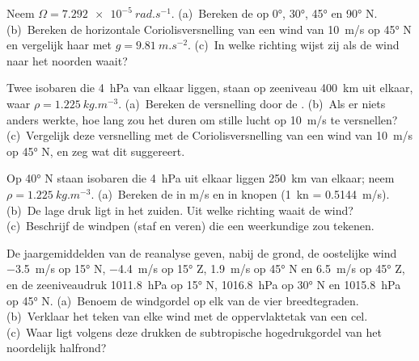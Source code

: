 \begin{exercise}[$\star$]\label{exo:b1:atmospheric-circulation:1}
Neem $\Omega = \qty{7.292e-5}{rad.s^{-1}}$. (a)~Bereken de  op
\ang{0}, \ang{30}, \ang{45} en \ang{90} N. (b)~Bereken de horizontale Coriolisversnelling
van een wind van \qty{10}{m/s} op \ang{45} N en vergelijk haar met $g =
\qty{9.81}{m.s^{-2}}$. (c)~In welke richting wijst zij als de wind naar het noorden waait?
\end{exercise}

\begin{exercise}[$\star$]\label{exo:b1:atmospheric-circulation:2}
Twee isobaren die \qty{4}{hPa} van elkaar liggen, staan op zeeniveau \qty{400}{km} uit elkaar, waar $\rho =
\qty{1.225}{kg.m^{-3}}$. (a)~Bereken de versnelling door de . (b)~Als er niets anders werkte, hoe lang zou het duren om stille lucht op
\qty{10}{m/s} te versnellen? (c)~Vergelijk deze versnelling met de Coriolisversnelling van een wind van
\qty{10}{m/s} op \ang{45} N, en zeg wat dit suggereert.
\end{exercise}

\begin{exercise}[$\star$]\label{exo:b1:atmospheric-circulation:3}
Op \ang{40} N staan isobaren die \qty{4}{hPa} uit elkaar liggen \qty{250}{km} van elkaar; neem $\rho =
\qty{1.225}{kg.m^{-3}}$. (a)~Bereken de  in \unit{m/s} en in knopen
(\qty{1}{kn} = \qty{0.5144}{m/s}). (b)~De lage druk ligt in het zuiden. Uit welke
richting waait de wind? (c)~Beschrijf de windpen (staf en veren) die een weerkundige zou tekenen.
\end{exercise}

\begin{exercise}[$\star$]\label{exo:b1:atmospheric-circulation:4}
De jaargemiddelden van de reanalyse geven, nabij de grond, de oostelijke wind
\qty{-3.5}{m/s} op \ang{15} N, \qty{-4.4}{m/s} op \ang{15} Z, \qty{+1.9}{m/s} op
\ang{45} N en \qty{+6.5}{m/s} op \ang{45} Z, en de zeeniveaudruk
\qty{1011.8}{hPa} op \ang{15} N, \qty{1016.8}{hPa} op \ang{30} N en
\qty{1015.8}{hPa} op \ang{45} N. (a)~Benoem de windgordel op elk van de vier breedtegraden.
(b)~Verklaar het teken van elke wind met de oppervlaktetak van een cel. (c)~Waar ligt volgens deze drukken de subtropische hogedrukgordel van het noordelijk halfrond?
\end{exercise}

